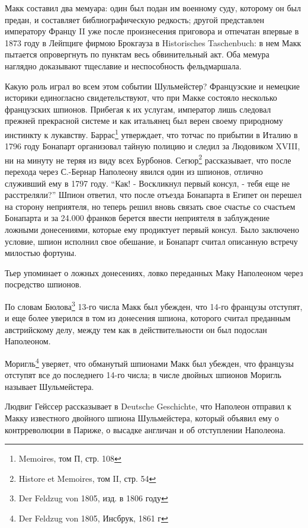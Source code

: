 \documentclass[
  oneside,
  12pt,
  titlepage]{book}
\begin{document}
Макк составил два мемуара: один был подан им военному суду, которому он был предан, и составляет библиографическую редкость; другой представлен императору Францу II уже после произнесения приговора и отпечатан впервые в 1873 году в Лейпциге фирмою Брокгауза в Historisches Taschenbuch: в нем Макк пытается опровергнуть по пунктам весь обвинительный акт. Оба мемура наглядно доказывают тщеславие и неспособность фельдмаршала.

Какую роль играл во всем этом событии Шульмейстер? Французские и немецкие историки единогласно свидетельствуют, что при Макке состояло несколько французских шпионов. Прибегая к их услугам, император лишь следовал прежней прекрасной системе и как итальянец был верен своему природному инстинкту к лукавству. Баррас\footnote{Memoires, том П, стр. 108} утверждает, что тотчас по прибытии в Италию в 1796 году Бонапарт организовал тайную полицию и следил за Людовиком XVIII, ни на минуту не теряя из виду всех Бурбонов. Сегюр\footnote{Histore et Memoires, том II, стр. 54} рассказывает, что после перехода через С.-Бернар Наполеону явился один из шпионов, отлично служивший ему в 1797 году. ``Как! - Воскликнул первый консул, - тебя еще не расстреляли?'' Шпион ответил, что после отъезда Бонапарта в Египет он перешел на сторону неприятеля, но теперь решил вновь связать свое счастье со счастьем Бонапарта и за 24.000 франков берется ввести неприятеля в заблуждение ложными донесениями, которые ему продиктует первый консул. Было заключено условие, шпион исполнил свое обешание, и Бонапарт считал описанную встречу милостью фортуны.

Тьер упоминает о ложных донесениях, ловко переданных Маку Наполеоном через посредство шпионов.

По словам Бюлова\footnote{Der Feldzug von 1805, изд. в 1806 году} 13-го числа Макк был убежден, что 14-го французы отступят, и еще более уверился в том из донесения шпиона, которого считал преданным австрийскому делу, между тем как в действительности он был подослан Наполеоном.

Моригль\footnote{Der Feldzug von 1805, Инсбрук, 1861 г} уверяет, что обманутый шпионами Макк был убежден, что французы отступят все до последнего 14-го числа; в числе двойных шпионов Моригль называет Шульмейстера.

Людвиг Гейссер рассказывает в Deutsche Geschichte, что Наполеон отправил к Макку известного двойного шпиона Шульмейстера, который объявил ему о контрреволюции в Париже, о высадке англичан и об отступлении Наполеона.
\end{document}

